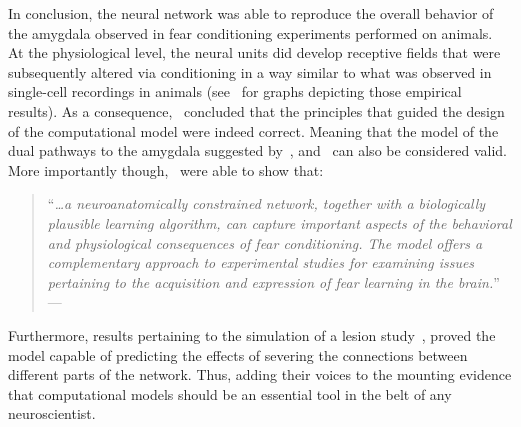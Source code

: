 In conclusion, the neural network was able to reproduce the overall behavior of the amygdala observed in fear conditioning experiments performed on animals. At the physiological level, the neural units did develop receptive fields that were subsequently altered via conditioning in a way similar to what was observed in single-cell recordings in animals (see~\citet{Armony1995} for graphs depicting those empirical results). As a consequence,~\citet{Armony1995} concluded that the principles that guided the design of the computational model were indeed correct. Meaning that the model of the dual pathways to the amygdala suggested by~\citet{Ledoux1992}, and~\citet{Romanski1992} can also be considered valid. More importantly though,~\citet{Armony1995} were able to show that:
\begin{quotation}
   ``\textit{\dots a neuroanatomically constrained network, together with a biologically plausible learning algorithm, can capture important aspects of the behavioral and physiological consequences of fear conditioning. The model offers a complementary approach to experimental studies for examining issues pertaining to the acquisition and expression of fear learning in the brain.}'' ---~\citet{Armony1995}
\end{quotation}
Furthermore, results pertaining to the simulation of a lesion study~\supercite{Armony1997,Armony1997a}, proved the model capable of predicting the effects of severing the connections between different parts of the network. Thus, adding their voices to the mounting evidence that computational models should be an essential tool in the belt of any neuroscientist.
